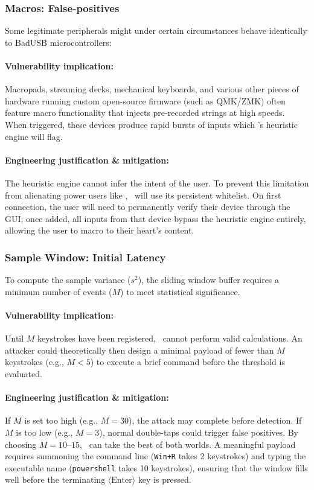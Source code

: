 \subsubsection{Macros: False-positives}

Some legitimate peripherals might under certain circumstances behave identically to BadUSB microcontrollers:

\paragraph{Vulnerability implication:}
Macropads, streaming decks, mechanical keyboards, and various other pieces of hardware running custom open-source firmware (such as QMK/ZMK) often feature macro functionality that injects pre-recorded strings at high speeds. When triggered, these devices produce rapid bursts of inputs which \projectNameFormatted's heuristic engine will flag.

\paragraph{Engineering justification \& mitigation:}
The heuristic engine cannot infer the intent of the user. To prevent this limitation from alienating power users like \stakeholdersPU, \projectNameFormatted\ will use its persistent whitelist. On first connection, the user will need to permanently verify their device through the GUI; once added, all inputs from that device bypass the heuristic engine entirely, allowing the user to macro to their heart's content.

\subsubsection{Sample Window: Initial Latency}

To compute the sample variance ($s^2$), the sliding window buffer requires a minimum number of events ($M$) to meet statistical significance.

\paragraph{Vulnerability implication:}
Until $M$ keystrokes have been registered, \projectNameFormatted\ cannot perform valid calculations. An attacker could theoretically then design a minimal payload of fewer than $M$ keystrokes (e.g., $M < 5$) to execute a brief command before the threshold is evaluated.

\paragraph{Engineering justification \& mitigation:}
If $M$ is set too high (e.g., $M = 30$), the attack may complete before detection. If $M$ is too low (e.g., $M = 3$), normal double-taps could trigger false positives. By choosing $M = 10\text{--}15$, \projectNameFormatted\ can take the best of both worlds. A meaningful payload requires summoning the command line (\texttt{Win+R} takes 2 keystrokes) and typing the executable name (\texttt{powershell} takes 10 keystrokes), ensuring that the window fills well before the terminating $\langle\text{Enter}\rangle$ key is pressed.

